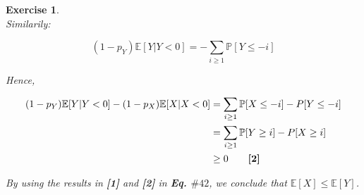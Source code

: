 \documentclass{article}
\newtheorem{exo}{Exercise}
\def\P{\mathbb{P}}
\def\E{\mathbb{E}}
\begin{document}
\begin{exo}{\ \\}
Similarily:

\[
    (1-p_Y) \E[Y|Y<0] = -\sum_{i \geq 1} \P[Y \leq -i]
\]

Hence,

\begin{align*}
     (1-p_Y) \E[Y|Y<0] -  (1-p_X) \E[X|X<0]
     &= \sum_{i \geq 1} \P[X \leq -i] - P[Y \leq -i] \\
     &= \sum_{i \geq 1} \P[Y \geq i] - P[X \geq i] \\
     &\geq 0   \quad \quad \text{\textbf{[2]} }
\end{align*}

By using the results in \textbf{[1]} and \textbf{[2]} in \textbf{Eq. $\#42$}, we conclude that $\E[X] \leq \E[Y]$.
\end{exo}
\end{document}

